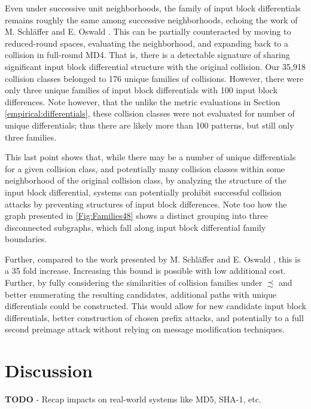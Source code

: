\documentclass[conference]{IEEEtran}
\begin{document}
Even under successive unit neighborhoods, the family of input block
differentials remains roughly the same among successive neighborhoods,
echoing the work of M. Schl{\"a}ffer and E. Oswald \cite{Schlaffer2006}.
This can be partially counteracted by moving to reduced-round spaces,
evaluating the neighborhood, and expanding back to a collision in
full-round MD4. That is, there is a detectable signature of sharing
significant input block differential structure with the original
collision. Our 35,918 collision classes belonged to 176 unique
families of collisions. However, there were only three unique families
of input block differentials with 100 input block differences. Note
however, that the unlike the metric evaluations in
Section \ref{empirical:differentials}, these collision classes were
not evaluated for number of unique differentials; thus there are likely
more than 100 patterns, but still only three families.

This last point shows that, while there may be a number of unique differentials
for a given collision class, and potentially many collision classes within
some neighborhood of the original collision class, by analyzing the structure
of the input block differential, systems can potentially prohibit successful
collision attacks by preventing structures of input block differences. Note
too how the graph presented in \ref{Fig:Families48} shows a distinct grouping
into three disconnected subgraphs, which fall along input block differential
family boundaries.

Further, compared to the work presented by M. Schl{\"a}ffer and E. Oswald
\cite{Schlaffer2006}, this is a 35 fold increase. Increasing this bound is
possible with low additional cost. Further, by fully considering the
similarities of collision families under $\precsim$ and better enumerating the
resulting candidates, additional paths with unique differentials could be
constructed. This would allow for new candidate input block differentials,
better construction of chosen prefix attacks, and potentially to a full second
preimage attack without relying on message modification techniques.



\section{Discussion} \label{Sec:Impacts}

\textbf{TODO} - Recap impacts on real-world systems like MD5, SHA-1, etc.
\end{document}
